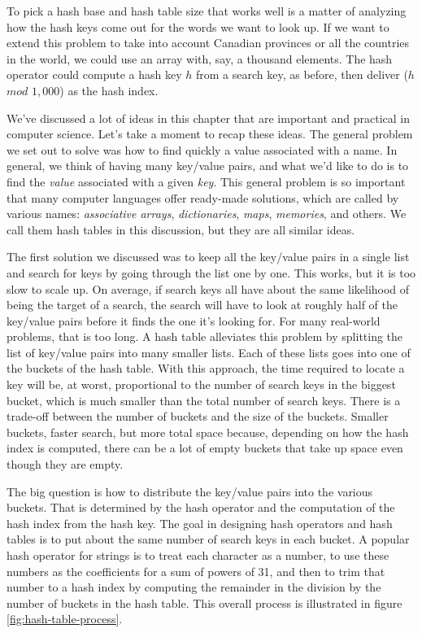 To pick a hash base and hash table size
that works well is a matter of analyzing how
the hash keys come out for the words we want to look up.
If we want to extend this problem to take into
account Canadian provinces or all the countries in the world, we could
use an array with, say, a thousand elements.
The hash operator could compute a hash key $h$ from a search key,
as before, then deliver ($h$ $mod$ $1,000$) as the hash index.

We've discussed a lot of ideas in this chapter
that are important and practical in computer science.
Let's take a moment to recap these ideas.
The general problem we set out to solve was how to find quickly a value
associated with a name. In general, we think of having many key/value pairs,
and what we'd like to do is to find the \emph{value} associated with a given
\emph{key}. This general problem is so important that many computer languages
offer ready-made solutions, which are called by
various names: \emph{associative arrays}, \emph{dictionaries},
\emph{maps}, \emph{memories}, and others.
We call them hash tables in this discussion,
but they are all similar ideas.

The first solution we discussed was
to keep all the key/value pairs in a single list
and search for keys by going through the list one by one.
This works, but it is too slow to scale up.
On average, if search keys all have about the same likelihood of
being the target of a search,
the search will have to look at roughly half
of the key/value pairs before it finds the one it's looking for. %
For many real-world problems, that is too long.
A hash table alleviates this problem
by splitting the list of key/value pairs into many smaller lists.
Each of these lists goes into one of the buckets of the hash table.
With this approach, the time required to locate a key
will be, at worst, proportional
to the number of search keys in the biggest bucket,
which is much smaller than the total number of search keys.
There is a trade-off between the number of buckets and the size of the buckets.
Smaller buckets, faster search, but more total space because,
depending on how the hash index is computed,
there can be a lot of empty buckets
that take up space even though they are empty.

The big question is how to distribute the key/value pairs into the various buckets.
That is determined by the hash operator and
the computation of the hash index from the hash key.
The goal in designing hash operators and hash tables
is to put about the same number of search keys in each bucket.
A popular hash operator for
strings is to treat each character as a number, to use these numbers as the
coefficients for a sum of powers of 31, and then to trim that number to
a hash index by computing the remainder in the division by
the number of buckets in the hash table.
This overall process is illustrated in figure \ref{fig:hash-table-process}.


